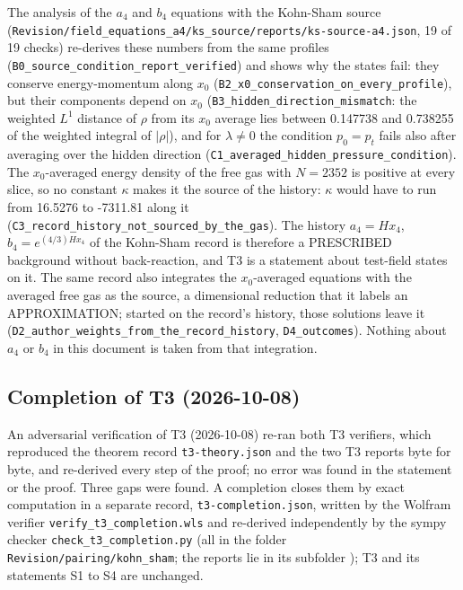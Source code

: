 \documentclass[11pt]{article}
\begin{document}
The analysis of the $a_4$ and $b_4$ equations with the Kohn-Sham source (\texttt{Revision\allowbreak{}/field\_e\allowbreak{}quations\allowbreak{}\_a4/ks\_s\allowbreak{}ource/re\allowbreak{}ports/ks\allowbreak{}-source-\allowbreak{}a4.json}, 19 of 19 checks) re-derives these numbers from the same profiles (\texttt{B0\_sourc\allowbreak{}e\_condit\allowbreak{}ion\_repo\allowbreak{}rt\_verif\allowbreak{}ied}) and shows why the states fail: they conserve energy-momentum along $x_0$ (\texttt{B2\_x0\_co\allowbreak{}nservati\allowbreak{}on\_on\_ev\allowbreak{}ery\_prof\allowbreak{}ile}), but their components depend on $x_0$ (\texttt{B3\_hidde\allowbreak{}n\_direct\allowbreak{}ion\_mism\allowbreak{}atch}: the weighted $L^1$ distance of $\rho$ from its $x_0$ average lies between 0.147738 and 0.738255 of the weighted integral of $|\rho|$), and for $\lambda \neq 0$ the condition $p_0 = p_t$ fails also after averaging over the hidden direction (\texttt{C1\_avera\allowbreak{}ged\_hidd\allowbreak{}en\_press\allowbreak{}ure\_cond\allowbreak{}ition}). The $x_0$-averaged energy density of the free gas with $N = 2352$ is positive at every slice, so no constant $\kappa$ makes it the source of the history: $\kappa$ would have to run from 16.5276 to -7311.81 along it (\texttt{C3\_recor\allowbreak{}d\_histor\allowbreak{}y\_not\_so\allowbreak{}urced\_by\allowbreak{}\_the\_gas}). The history $a_4 = Hx_4$, $b_4 = e^{(4/3)Hx_4}$ of the Kohn-Sham record is therefore a PRESCRIBED background without back-reaction, and T3 is a statement about test-field states on it. The same record also integrates the $x_0$-averaged equations with the averaged free gas as the source, a dimensional reduction that it labels an APPROXIMATION; started on the record's history, those solutions leave it (\texttt{D2\_autho\allowbreak{}r\_weight\allowbreak{}s\_from\_t\allowbreak{}he\_recor\allowbreak{}d\_histor\allowbreak{}y}, \texttt{D4\_outco\allowbreak{}mes}). Nothing about $a_4$ or $b_4$ in this document is taken from that integration.

\subsection{Completion of T3 (2026-10-08)}

An adversarial verification of T3 (2026-10-08) re-ran both T3 verifiers, which reproduced the theorem record \texttt{t3-theor\allowbreak{}y.json} and the two T3 reports byte for byte, and re-derived every step of the proof; no error was found in the statement or the proof. Three gaps were found. A completion closes them by exact computation in a separate record, \texttt{t3-compl\allowbreak{}etion.js\allowbreak{}on}, written by the Wolfram verifier \texttt{verify\_t\allowbreak{}3\_comple\allowbreak{}tion.wls} and re-derived independently by the sympy checker \texttt{check\_t3\allowbreak{}\_complet\allowbreak{}ion.py} (all in the folder \texttt{Revision\allowbreak{}/pairing\allowbreak{}/kohn\_sh\allowbreak{}am}; the reports lie in its subfolder \texttt{}); T3 and its statements S1 to S4 are unchanged.
\end{document}

